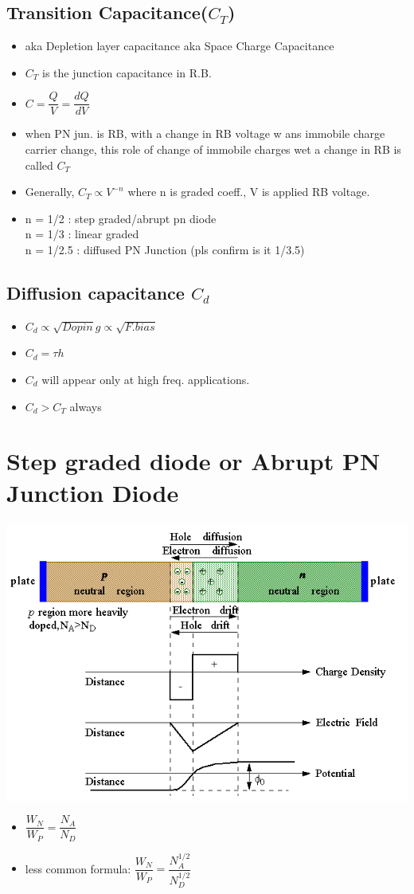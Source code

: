 \documentclass[10pt, a4paper]{report}
\begin{document}
	\subsection{Transition Capacitance($ C_T $)}
	\begin{itemize}
		\item 	aka Depletion layer capacitance aka Space Charge Capacitance
		\item $ C_T $ is the junction capacitance in R.B.
		\item $ C = \dfrac{Q}{V} = \dfrac{dQ}{dV} $
		 \item when PN jun. is RB, with a change in RB voltage w ans immobile charge carrier change, this role of change of immobile charges wet a change in RB is called $ C_T $ 
		\item Generally, $ C_T \propto V^{-n} $ where n is graded coeff., V is applied RB voltage.
	\item n = 1/2 : step graded/abrupt pn diode \\
		n = 1/3 : linear graded \\
		n = 1/2.5 : diffused PN Junction (pls confirm is it 1/3.5)
	\end{itemize}	
	\subsection{Diffusion capacitance $ C_d $}
	\begin{itemize}
		\item $ C_d \propto\sqrt{Dopin}g \propto \sqrt{F.bias}$
		\item $ C_d = \tau h $
		\item $ C_d $ will appear only at high freq. applications.
		\item $ C_d > C_T$ always 
	\end{itemize}
	
	\section{Step graded diode or Abrupt PN Junction Diode}
		\includegraphics[width=0.7\linewidth]{img/step-graded-diode}
	\begin{itemize}
		\item $ \dfrac{W_N}{W_P}  =  \dfrac{N_A}{N_D} $
		\item less common formula: $ \dfrac{W_N}{W_P}  =  \dfrac{N_A^{1/2}}{N_D^{1/2}} $
	\end{itemize}
\end{document}
